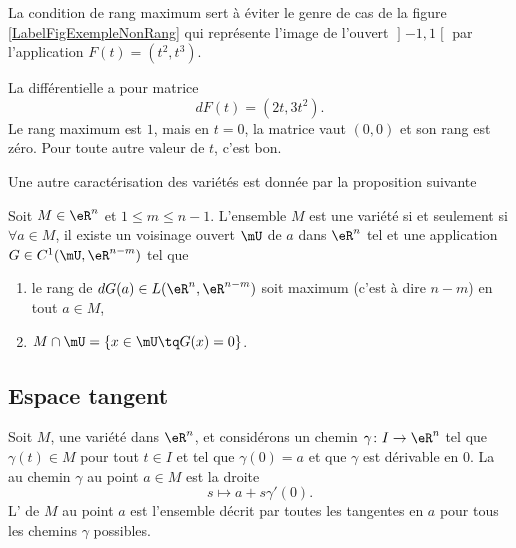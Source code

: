 La condition de rang maximum sert à éviter le genre de cas de la figure \ref{LabelFigExempleNonRang} qui représente l'image de l'ouvert $\mathopen] -1 , 1 \mathclose[$ par l'application $F(t)=(t^2,t^3)$.
\newcommand{\CaptionFigExempleNonRang}{Quelque chose qui n'est pas de rang maximum et qui n'est pas une variété.}

%
La différentielle a pour matrice
\begin{equation}
	dF(t)=(2t,3t^2).
\end{equation}
Le rang maximum est $1$, mais en $t=0$, la matrice vaut $(0,0)$ et son rang est zéro. Pour toute autre valeur de $t$, c'est bon.

Une autre caractérisation des variétés est donnée par la proposition suivante %
\begin{proposition}		\label{PropCarVarZerFonc}
	Soit $M\in \eR^n$ et $1\leq m\leq n-1$. L'ensemble $M$ est une variété si et seulement si $\forall a\in M$, il existe un voisinage ouvert $\mU$ de $a$ dans $\eR^n$ tel et une application $G\in C^1(\mU,\eR^{n-m})$ tel que
	\begin{enumerate}

		\item
			le rang de $dG(a)\in L(\eR^n,\eR^{n-m})$ soit maximum (c'est à dire $n-m$) en tout $a\in M$,
		\item
			$M\cap\mU=\{ x\in\mU\tq G(x)=0 \}$.

	\end{enumerate}
\end{proposition}

\subsection{Espace tangent}

Soit $M$, une variété dans $\eR^n$, et considérons un chemin $\gamma\colon I\to \eR^n$ tel que $\gamma(t)\in M$ pour tout $t\in I$ et tel que $\gamma(0)=a$ et que $\gamma$ est dérivable en $0$. La  au chemin $\gamma$ au point $a\in M$ est la droite
\begin{equation}
	s\mapsto a+s\gamma'(0).
\end{equation}
L' de $M$ au point $a$ est l'ensemble décrit par toutes les tangentes en $a$ pour tous les chemins $\gamma$ possibles.


